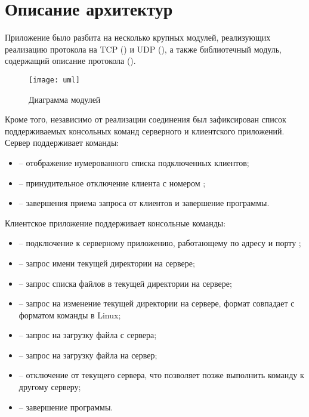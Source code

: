 \newpage

\section{Описание архитектур}


Приложение было разбита на несколько крупных модулей, реализующих реализацию протокола на TCP () и UDP (), а также библиотечный модуль, содержащий описание протокола (). 

\begin{figure}[H]
	\centering
	\texttt{[image: uml]}
	\caption{Диаграмма модулей}
\end{figure}

Кроме того, независимо от реализации соединения был зафиксирован список поддерживаемых консольных команд серверного и клиентского приложений. Сервер поддерживает команды:
\begin{itemize}
	\item {} -- отображение нумерованного списка подключенных клиентов;
	\item {} -- принудительное отключение клиента с номером ;
	\item {} -- завершения приема запроса от клиентов и завершение программы.
\end{itemize}

\noindent Клиентское приложение поддерживает консольные команды:
\begin{itemize}
	\item {} -- подключение к серверному приложению, работающему по адресу  и порту ;
	\item {} -- запрос имени текущей директории на сервере;
	\item {} -- запрос списка файлов в текущей директории на сервере;
	\item {} -- запрос на изменение текущей директории на сервере, формат совпадает с форматом команды  в Linux;
	\item {} -- запрос на загрузку файла  с сервера;
	\item {} -- запрос на загрузку файла  на сервер;
	\item {} -- отключение от текущего сервера, что позволяет позже выполнить команду  к другому серверу;
	\item {} -- завершение программы.
\end{itemize}

